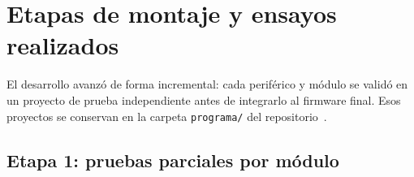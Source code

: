 \section{Etapas de montaje y ensayos realizados}\label{sec:ensayos}
El desarrollo avanzó de forma incremental: cada periférico y módulo se validó en un proyecto
de prueba independiente antes de integrarlo al firmware final. Esos proyectos se conservan en
la carpeta \texttt{programa/} del repositorio~\cite{repo}.

\subsection{Etapa 1: pruebas parciales por módulo}

